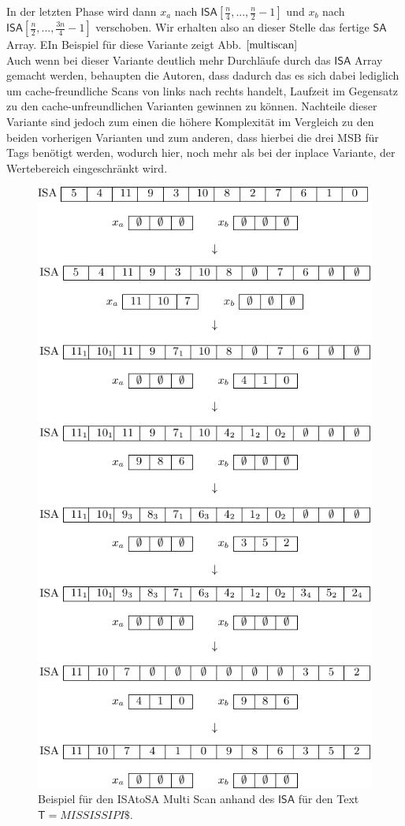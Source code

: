 In der letzten Phase wird dann $x_a$ nach $\mathsf{ISA}[\frac{n}{4},...,\frac{n}{2}-1]$ und $x_b$ nach \\ $\mathsf{ISA}[\frac{n}{2},...,\frac{3n}{4}-1]$ verschoben. Wir erhalten also an dieser Stelle das fertige $\mathsf{SA}$ Array. EIn Beispiel für diese Variante zeigt Abb. $\ref{multiscan}$\\
Auch wenn bei dieser Variante deutlich mehr Durchläufe durch das $\mathsf{ISA}$ Array gemacht werden, behaupten die Autoren, dass dadurch das es sich dabei lediglich um cache-freundliche Scans von links nach rechts handelt, Laufzeit im Gegensatz zu den cache-unfreundlichen Varianten gewinnen zu können. Nachteile dieser Variante sind jedoch zum einen die höhere Komplexität im Vergleich zu den beiden vorherigen Varianten und zum anderen, dass hierbei die drei MSB für Tags benötigt werden, wodurch hier, noch mehr als bei der inplace Variante, der Wertebereich eingeschränkt wird.
\begin{center}
\begin{figure}
\includegraphics[scale=1]{kapitel/4_komponenten/techniken/bilder/MultiScanExample.pdf}
\caption{Beispiel für den ISAtoSA Multi Scan anhand des $\mathsf{ISA}$ für den Text $\mathsf{T}=MISSISSIPI\$$.}
\label{multiscan}
\end{figure}
\end{center}
